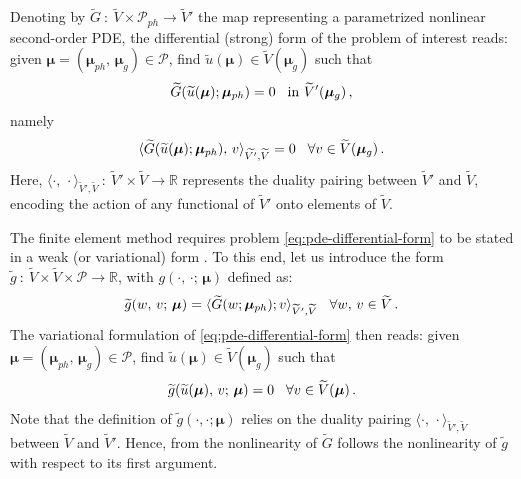 \documentclass[12pt, a4paper, twoside, openright, notitlepage]{report}
\numberwithin{equation}{chapter}
\theoremstyle{theorem}
\theoremstyle{definition}
\theoremstyle{remark}
\theoremstyle{proposition}
\numberwithin{figure}{chapter}
\newcommand{\wt}[1]{\widetilde{#1}}
\newcommand{\bg}[1]{\boldsymbol{#1}}
\begin{document}
		Denoting by $\wt{G} ~ : ~ \wt{V} \times \mathcal{P}_{ph} \rightarrow \wt{V}'$ the map representing a parametrized nonlinear second-order PDE, the differential (strong) form of the problem of interest reads: given $\bg{\mu} = (\bg{\mu}_{ph}, \, \bg{\mu}_g) \in \mathcal{P}$, find $\wt{u}(\boldsymbol{\mu}) \in \wt{V}(\bg{\mu}_g)$ such that
		\begin{equation}
			\label{eq:pde-differential-form}
			\wt{G}(\wt{u}(\bg{\mu}); \bg{\mu}_{ph}) = 0 \hspace*{0.3cm} \text{in $\wt{V}'(\bg{\mu}_g)$} \, ,
		\end{equation}
		namely
		\begin{equation*}
			\langle \wt{G}(\wt{u}(\bg{\mu}); \bg{\mu}_{ph}), \, v \rangle_{\wt{V'},\wt{V}} = 0 \hspace*{0.3cm} \forall v \in \wt{V}(\bg{\mu}_g) \, .
		\end{equation*}
		Here, $\langle \cdot, \, \cdot \rangle_{\wt{V}',\wt{V}} ~ : ~ \wt{V}' \times \wt{V} \rightarrow \mathbb{R}$ represents the duality pairing between $\wt{V}'$ and $\wt{V}$, encoding the action of any functional of $\wt{V}'$ onto elements of $\wt{V}$.
		
		The finite element method requires problem \eqref{eq:pde-differential-form} to be stated in a weak (or variational) form \cite{Qua10}. To this end, let us introduce the form $\wt{g} ~ : ~ \wt{V} \times \wt{V} \times \mathcal{P} \rightarrow \mathbb{R}$, with $g(\cdot, \, \cdot; \, \bg{\mu})$ defined as:
		\begin{equation*}
			\wt{g}(w, \, v; \, \bg{\mu}) = \langle \wt{G}(w; \bg{\mu}_{ph}); v \rangle_{\wt{V}',\wt{V}} \hspace*{0.3cm} \forall w, \, v \in \wt{V} \, .
		\end{equation*}
		The variational formulation of \eqref{eq:pde-differential-form} then reads: given $\bg{\mu} = (\bg{\mu}_{ph}, \, \bg{\mu}_g) \in \mathcal{P}$, find $\wt{u}(\bg{\mu}) \in \wt{V}(\bg{\mu}_g)$ such that
		\begin{equation}
			\label{eq:pde-variational-form}
			\wt{g}(\wt{u}(\bg{\mu}), \, v; \, \bg{\mu}) = 0 \hspace*{0.3cm} \forall v \in \wt{V}(\bg{\mu}) \, .
		\end{equation}
		Note that the definition of $\wt{g}(\cdot,\cdot;\bg{\mu})$ relies on the duality pairing $\langle \cdot, \, \cdot \rangle_{\wt{V}',\wt{V}}$ between $\wt{V}$ and $\wt{V}'$. Hence, from the nonlinearity of $\wt{G}$ follows the nonlinearity of $\wt{g}$ with respect to its first argument.
		
\end{document}
